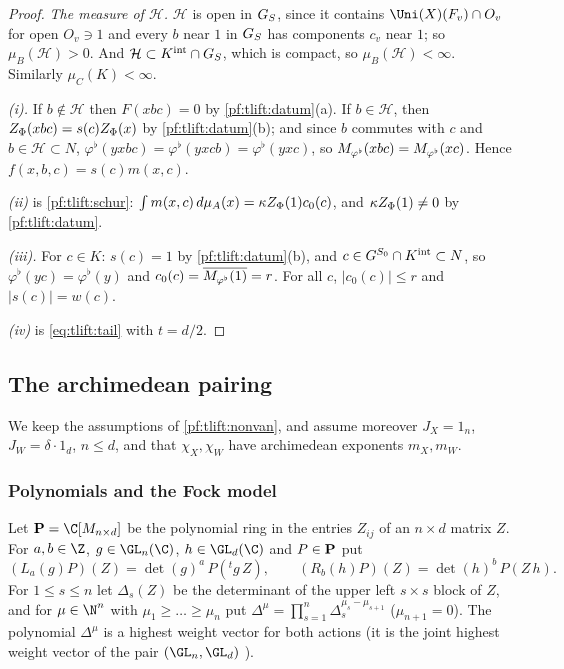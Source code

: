 \begin{proof}
\emph{The measure of $\mathcal H$.} $\mathcal H$ is open in $G_S$, since it contains $\Uni(X)(F_v)\cap O_v$ for open $O_v\ni1$ and every
$b$ near $1$ in $G_S$ has components $c_v$ near $1$;
so $\mu_B(\mathcal H)>0$. And $\mathcal H\subset K^{\mathrm{int}}\cap G_S$, which is compact, so $\mu_B(\mathcal H)<\infty$. Similarly
$\mu_C(K)<\infty$.

\emph{(i).} If $b\notin\mathcal H$ then $F(xbc)=0$ by \cref{pf:tlift:datum}(a). If $b\in\mathcal H$, then
$Z_\Phi(xbc)=s(c)Z_\Phi(x)$ by \cref{pf:tlift:datum}(b); and since $b$ commutes with $c$ and $b\in\mathcal H\subset N$,
$\varphi^\flat(yxbc)=\varphi^\flat(yxcb)=\varphi^\flat(yxc)$, so $M_{\varphi^\flat}(xbc)=M_{\varphi^\flat}(xc)$. Hence $f(x,b,c)=s(c)m(x,c)$.

\emph{(ii)} is \cref{pf:tlift:schur}: $\int m(x,c)\,d\mu_A(x)=\kappa Z_\Phi(1)c_0(c)$, and $\kappa Z_\Phi(1)\ne0$ by
\cref{pf:tlift:datum}.

\emph{(iii).} For $c\in K$: $s(c)=1$ by \cref{pf:tlift:datum}(b), and $c\in G^{S_0}\cap K^{\mathrm{int}}\subset N$, so
$\varphi^\flat(yc)=\varphi^\flat(y)$ and $c_0(c)=\overline{M_{\varphi^\flat}(1)}=r$. For all $c$, $|c_0(c)|\le r$ and $|s(c)|=w(c)$.

\emph{(iv)} is \eqref{eq:tlift:tail} with $t=d/2$.
\end{proof}


\subsection{The archimedean pairing}\label{pf:tlift:real}

We keep the assumptions of \cref{pf:tlift:nonvan}, and assume moreover $J_X=1_n$, $J_W=\delta\cdot1_d$, $n\le d$,
and that $\chi_X,\chi_W$ have archimedean exponents $m_X,m_W$.

\subsubsection*{Polynomials and the Fock model}
Let $\tliftPP=\C[M_{n\times d}]$ be the polynomial ring in the entries $Z_{ij}$ of an $n\times d$ matrix $Z$. For $a,b\in\Z$,
$g\in\GL_n(\C)$, $h\in\GL_d(\C)$ and $P\in\mathbf{P}$ put
\[
  (L_a(g)P)(Z)=\det(g)^a\,P({}^tg\,Z),\qquad(R_b(h)P)(Z)=\det(h)^b\,P(Z\,h).
\]
For $1\le s\le n$ let $\Delta_s(Z)$ be the determinant of the upper left $s\times s$ block of $Z$, and for $\mu\in\N^n$ with
$\mu_1\ge\dots\ge\mu_n$ put $\Delta^\mu=\prod_{s=1}^n\Delta_s^{\mu_s-\mu_{s+1}}$ ($\mu_{n+1}=0$). The polynomial $\Delta^\mu$ is a
highest weight vector for both actions (it is the joint highest weight vector of the pair
$(\GL_n,\GL_d)$ \cite{Howe1989}).

